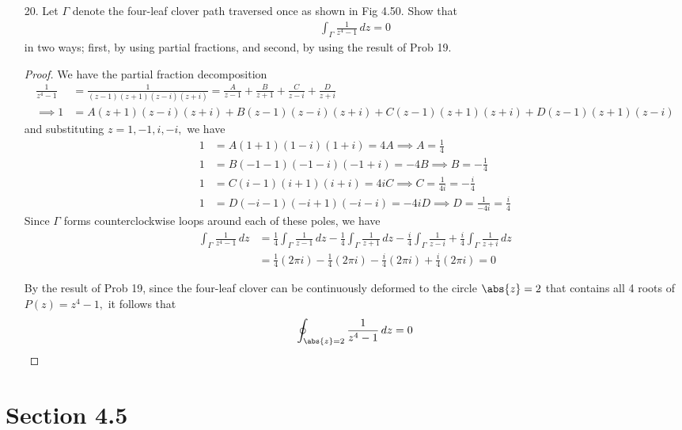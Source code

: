 \documentclass{article}
\begin{document}
\begin{itemize}
	\item[20.] Let $\Gamma$ denote the four-leaf clover path traversed once as shown in Fig 4.50. Show that
		\begin{align*}
			\int_\Gamma \frac{1}{z^4-1}\, dz = 0
		\end{align*}
		in two ways; first, by using partial fractions, and second, by using the result of Prob 19.
		\begin{proof}
			We have the partial fraction decomposition
			\begin{align*}
				\frac{1}{z^4-1} &= \frac{1}{(z-1)(z+1)(z-i)(z+i)} = \frac{A}{z-1} + \frac{B}{z+1} + \frac{C}{z-i} + \frac{D}{z+i} \\
				\implies 1 &= A(z+1)(z-i)(z+i) + B(z-1)(z-i)(z+i) + C(z-1)(z+1)(z+i) + D(z-1)(z+1)(z-i)
			\end{align*}
			and substituting $z=1, -1, i, -i,$ we have
			\begin{align*}
				1 &= A(1+1)(1-i)(1+i) = 4A \implies A = \frac{1}{4} \\
				1 &= B(-1-1)(-1-i)(-1+i) = -4B \implies B = - \frac{1}{4} \\
				1 &= C(i-1)(i+1)(i+i) = 4iC \implies C = \frac{1}{4i} = -\frac{i}{4} \\
				1 &= D(-i-1)(-i+1)(-i-i) = -4iD \implies D = \frac{1}{-4i} = \frac{i}{4}
			\end{align*}
			Since $\Gamma$ forms counterclockwise loops around each of these poles, we have
			\begin{align*}
				\int_\Gamma \frac{1}{z^4-1}\, dz &= \frac{1}{4}\int_\Gamma \frac{1}{z-1}\, dz - \frac{1}{4} \int_\Gamma\frac{1}{z+1}\, dz - \frac{i}{4}\int_\Gamma\frac{1}{z-i} + \frac{i}{4}\int_\Gamma\frac{1}{z+i}\, dz \\
				&= \frac{1}{4} (2\pi i) - \frac{1}{4}(2\pi i) - \frac{i}{4}(2\pi i) + \frac{i}{4}(2\pi i) = 0
			\end{align*}

			By the result of Prob 19, since the four-leaf clover can be continuously deformed to the circle $\abs{z}=2$ that contains all 4 roots of $P(z)=z^4-1,$ it follows that
			\begin{align*}
				\oint_{\abs{z}=2} \frac{1}{z^4-1}\, dz = 0
			\end{align*}
		\end{proof}
		
\end{itemize}

\section*{Section 4.5}
\end{document}
